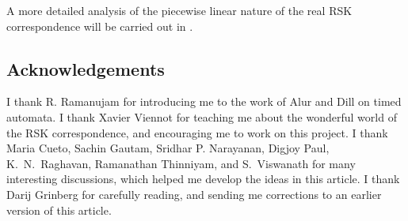\documentclass[10pt]{amsproc}
\theoremstyle{definition}
\theoremstyle{remark}
\begin{document}
A more detailed analysis of the piecewise linear nature of the real RSK correspondence will be carried out in \cite{cgp}.
\subsection*{Acknowledgements}
I thank R. Ramanujam for introducing me to the work of Alur and Dill on timed automata.
I thank Xavier Viennot for teaching me about the wonderful world of the RSK correspondence, and encouraging me to work on this project.
I thank Maria Cueto, Sachin Gautam, Sridhar P. Narayanan, Digjoy Paul, K.~N.~Raghavan, Ramanathan Thinniyam, and S.~Viswanath for many interesting discussions, which helped me develop the ideas in this article.
I thank Darij Grinberg for carefully reading, and sending me corrections to an earlier version of this article.


\end{document}
